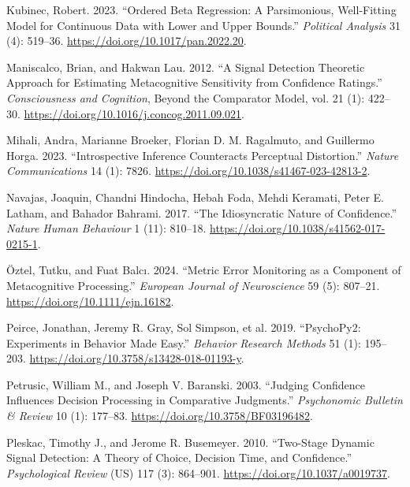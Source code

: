 \documentclass[
]{article}
\newlength{\cslhangindent}
\newenvironment{CSLReferences}[2] %
 {\begin{list}{}{%
  \setlength{\itemindent}{0pt}
  \setlength{\leftmargin}{0pt}
  \setlength{\parsep}{0pt}
  \ifodd #1
   \setlength{\leftmargin}{\cslhangindent}
   \setlength{\itemindent}{-1\cslhangindent}
  \fi
  \setlength{\itemsep}{#2\baselineskip}}}
 {\end{list}}
\begin{document}
\begin{CSLReferences}{1}{1}
Kubinec, Robert. 2023. {``Ordered {Beta Regression}: {A Parsimonious},
{Well-Fitting Model} for {Continuous Data} with {Lower} and {Upper
Bounds}.''} \emph{Political Analysis} 31 (4): 519--36.
\url{https://doi.org/10.1017/pan.2022.20}.

Maniscalco, Brian, and Hakwan Lau. 2012. {``A Signal Detection Theoretic
Approach for Estimating Metacognitive Sensitivity from Confidence
Ratings.''} \emph{Consciousness and Cognition}, Beyond the {Comparator
Model}, vol. 21 (1): 422--30.
\url{https://doi.org/10.1016/j.concog.2011.09.021}.

Mihali, Andra, Marianne Broeker, Florian D. M. Ragalmuto, and Guillermo
Horga. 2023. {``Introspective Inference Counteracts Perceptual
Distortion.''} \emph{Nature Communications} 14 (1): 7826.
\url{https://doi.org/10.1038/s41467-023-42813-2}.

Navajas, Joaquin, Chandni Hindocha, Hebah Foda, Mehdi Keramati, Peter E.
Latham, and Bahador Bahrami. 2017. {``The Idiosyncratic Nature of
Confidence.''} \emph{Nature Human Behaviour} 1 (11): 810--18.
\url{https://doi.org/10.1038/s41562-017-0215-1}.

Öztel, Tutku, and Fuat Balcı. 2024. {``Metric Error Monitoring as a
Component of Metacognitive Processing.''} \emph{European Journal of
Neuroscience} 59 (5): 807--21. \url{https://doi.org/10.1111/ejn.16182}.

Peirce, Jonathan, Jeremy R. Gray, Sol Simpson, et al. 2019.
{``{PsychoPy2}: {Experiments} in Behavior Made Easy.''} \emph{Behavior
Research Methods} 51 (1): 195--203.
\url{https://doi.org/10.3758/s13428-018-01193-y}.

Petrusic, William M., and Joseph V. Baranski. 2003. {``Judging
Confidence Influences Decision Processing in Comparative Judgments.''}
\emph{Psychonomic Bulletin \& Review} 10 (1): 177--83.
\url{https://doi.org/10.3758/BF03196482}.

Pleskac, Timothy J., and Jerome R. Busemeyer. 2010. {``Two-Stage Dynamic
Signal Detection: {A} Theory of Choice, Decision Time, and
Confidence.''} \emph{Psychological Review} (US) 117 (3): 864--901.
\url{https://doi.org/10.1037/a0019737}.


\end{CSLReferences}
\end{document}
